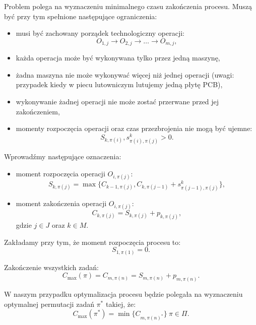 Problem polega na wyznaczeniu minimalnego czasu zakończenia procesu. Muszą być przy tym spełnione następujące ograniczenia:
\begin{itemize}
	\item musi być zachowany porządek technologiczny operacji:
		  \begin{equation}
			  O_{1, j} \rightarrow O_{2, j} \rightarrow \dots \rightarrow O_{m, j},
		  \end{equation}
	\item każda operacja może być wykonywana tylko przez jedną maszynę,
	\item żadna maszyna nie może wykonywać więcej niż jednej operacji (uwagi: przypadek kiedy w piecu lutowniczym lutujemy jedną płytę PCB),
	\item wykonywanie żadnej operacji nie może zostać przerwane przed jej zakończeniem,
	\item momenty rozpoczęcia operacji oraz czas przezbrojenia nie mogą być ujemne:
		  \begin{equation}
			  S_{k, \pi(i)}, s^{k}_{\pi(i), \pi(j)} > 0.
		  \end{equation}
\end{itemize}

\breakparagraph{}
Wprowadźmy następujące oznaczenia:
\begin{itemize}
	\item
	moment rozpoczęcia operacji $O_{i,\pi(j)}$:
	\begin{equation}
		S_{k, \pi(j)}=\max\{C_{k-1, \pi(j)}, C_{k, \pi(j-1)}+s^k_{\pi(j-1), \pi(j)}\},
	\end{equation}
	\item
	moment zakończenia operacji $O_{i,\pi(j)}$:
	\begin{equation}
		C_{k, \pi(j)} = S_{k, \pi(j)} + p_{k, \pi(j)},
	\end{equation}
	gdzie $ j \in J$ oraz $k \in M$.
\end{itemize}


\breakparagraph{}
Zakładamy przy tym, że moment rozpoczęcia procesu to:
\begin{equation}
	S_{1, \pi(1)}=0.
\end{equation}

\breakparagraph{}
Zakończenie wszystkich zadań:
\begin{equation}
	C_{\max}(\pi) = 	C_{m, \pi(n)} = S_{m, \pi(n)} + p_{m, \pi(n)}.
\end{equation}

\breakparagraph{}
W naszym przypadku optymalizacja procesu będzie polegała na wyznaczeniu optymalnej permutacji zadań $\pi^*$ takiej, że:
\begin{equation}
	C_{\max}(\pi^{*}) = \min\{C_{m, \pi{(n)}^{*}}\} \ \pi \in \Pi.
\end{equation}
